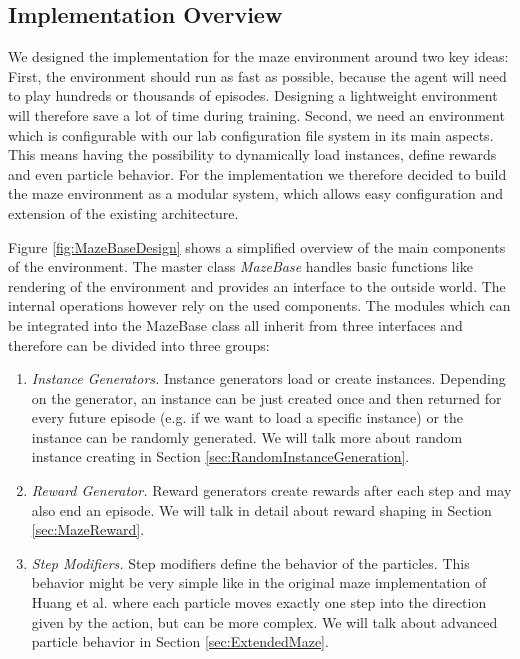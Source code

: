 \subsection{Implementation Overview} \label{sec:MazeImplementation}
We designed the implementation for the maze environment around two key ideas: First, the environment should run as fast as possible, because the agent will need to play hundreds or thousands of episodes. Designing a lightweight environment will therefore save a lot of time during training. Second, we need an environment which is configurable with our lab configuration file system in its main aspects. This means having the possibility to dynamically load instances, define rewards and even particle behavior. For the implementation we therefore decided to build the maze environment as a modular system, which allows easy configuration and extension of the existing architecture. 

Figure \ref{fig:MazeBaseDesign} shows a simplified overview of the main components of the environment. The master class \textit{MazeBase} handles basic functions like rendering of the environment and provides an interface to the outside world. The internal operations however rely on the used components. The modules which can be integrated into the MazeBase class all inherit from three interfaces and therefore can be divided into three groups:

\begin{enumerate}
    \item \textit{Instance Generators.} Instance generators load or create instances. Depending on the generator, an instance can be just created once and then returned for every future episode (e.g. if we want to load a specific instance) or the instance can be randomly generated. We will talk more about random instance creating in Section \ref{sec:RandomInstanceGeneration}.
    \item \textit{Reward Generator.} Reward generators create rewards after each step and may also end an episode. We will talk in detail about reward shaping in Section \ref{sec:MazeReward}.
    \item \textit{Step Modifiers.} Step modifiers define the behavior of the particles. This behavior might be very simple like in the original maze implementation of Huang et al. where each particle moves exactly one step into the direction given by the action, but can be more complex. We will talk about advanced particle behavior in Section \ref{sec:ExtendedMaze}. 
\end{enumerate}

